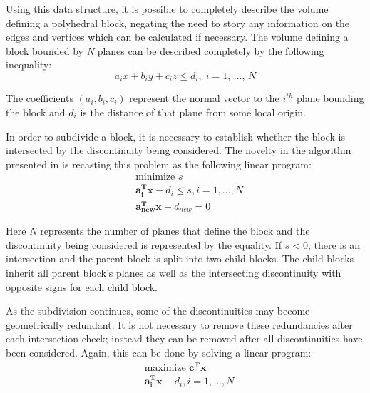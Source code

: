 Using this data structure, it is possible to completely describe the volume defining a polyhedral block, negating the need to story any information on the edges and vertices which can be calculated if necessary. The volume defining a block bounded by \textit{N} planes can be described completely by the following inequality:
\begin{equation}
a_ix + b_iy + c_iz \leq d_i, \; i = 1 ,\, \ldots ,\, N
\end{equation}

The coefficients $(a_i, b_i, c_i)$ represent the normal vector to the $i^{th}$ plane bounding the block and $d_i$ is the distance of that plane from some local origin. \par
 
In order to subdivide a block, it is necessary to establish whether the block is intersected by the discontinuity being considered. The novelty in the algorithm presented in \cite{slicing} is recasting this problem as the following linear program: 
\begin{equation}
\begin{aligned} 
&\text{minimize } s\\
&\boldsymbol{a_{i}^{T} x} - d_i \leq s, i = 1,...,N\\
&\boldsymbol{a_{new}^{T} x} - d_{new} = 0
\end{aligned}
\end{equation}

Here \textit{N} represents the number of planes that define the block and the discontinuity being considered is represented by the equality. If $s < 0$, there is an intersection and the parent block is split into two child blocks. The child blocks inherit all parent block's planes as well as the intersecting discontinuity with opposite signs for each child block. \par

As the subdivision continues, some of the discontinuities may become geometrically redundant. It is not necessary to remove these redundancies after each intersection check; instead they can be removed after all discontinuities have been considered. Again, this can be done by solving a linear program: 
\begin{equation}
\begin{aligned}
&\text{maximize }\boldsymbol{c^{T} x}\\
&\boldsymbol{a_{i}^{T} x} - d_{i}, i = 1,...,N
\end{aligned}
\end{equation}

